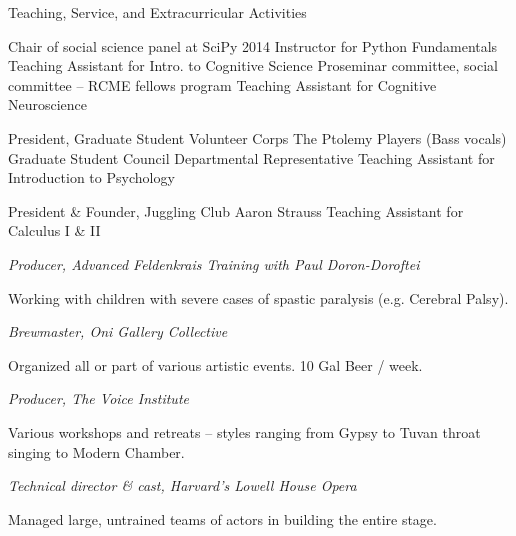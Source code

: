 \begin{rubric}{Teaching, Service, and Extracurricular Activities}

\entry*[2014] Chair of social science panel at SciPy 2014
\entry*[2013--2014] Instructor for Python Fundamentals
\entry*[2012] Teaching Assistant for Intro. to Cognitive Science
\entry*[2010--2012] Proseminar committee, social committee -- RCME fellows program
\entry*[2007] Teaching Assistant for Cognitive Neuroscience

\entry*[2001--2002] President, Graduate Student Volunteer Corps
\entry*[2001--2002] The Ptolemy Players (Bass vocals)
\entry*[2001] Graduate Student Council Departmental Representative
\entry*[2000] Teaching Assistant for Introduction to Psychology

\entry*[1996--1999] President \& Founder, Juggling Club
\entry*[1996--1997] Aaron Strauss Teaching Assistant for Calculus I \& II

\entry*[2004] \emph{Producer, Advanced Feldenkrais Training with Paul Doron-Doroftei}
\par Working with children with severe cases of spastic paralysis (e.g. Cerebral
Palsy).

\entry*[2003] \emph{Brewmaster, Oni Gallery Collective}
\par Organized all or part of various artistic events.  10 Gal Beer / week.

\entry*[2001-2003] \emph{Producer, The Voice Institute}
\par Various workshops and retreats -- styles ranging from Gypsy to Tuvan throat
singing to Modern Chamber.

\entry*[2003] \emph{Technical director \& cast, Harvard's Lowell House Opera}
\par Managed large, untrained teams of actors in building the entire stage.


\end{rubric}
